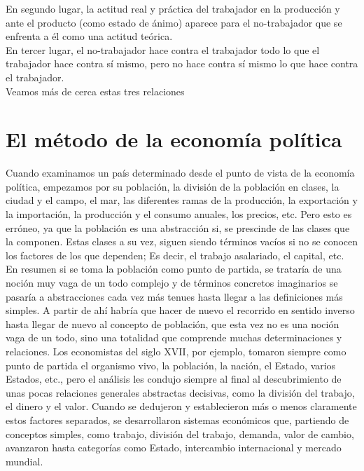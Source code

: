 En segundo lugar, la actitud real y práctica del trabajador en la producción y ante el producto (como estado de ánimo) aparece para el no-trabajador que se enfrenta a él como una actitud teórica. \\

En tercer lugar, el no-trabajador hace contra el trabajador todo lo que el trabajador hace contra sí mismo, pero no hace contra sí mismo lo que hace contra el trabajador.\\

Veamos más de cerca estas tres relaciones

\section{El método de la economía política}

Cuando examinamos un país determinado desde el punto de vista de la economía política, empezamos por su población, la división de la población en clases, la ciudad y el campo, el mar, las diferentes ramas de la producción, la exportación y la importación, la producción y el consumo anuales, los precios, etc. Pero esto es erróneo, ya que la población es una abstracción si, se prescinde de las clases que la componen. Estas clases a su vez, siguen siendo términos vacíos si no se conocen los factores de los que dependen; Es decir, el trabajo asalariado, el capital, etc. En resumen si se toma la población como punto de partida, se trataría de una noción muy vaga de un todo complejo y de términos concretos imaginarios se pasaría a abstracciones cada vez más tenues hasta llegar a las definiciones más simples. A partir de ahí habría que hacer de nuevo el recorrido en sentido inverso hasta llegar de nuevo al concepto de población, que esta vez no es una noción vaga de un todo, sino una totalidad que comprende muchas determinaciones y relaciones.  Los economistas del siglo XVII, por ejemplo, tomaron siempre como punto de partida el organismo vivo, la población, la nación, el Estado, varios Estados, etc., pero el análisis les condujo siempre al final al descubrimiento de unas pocas relaciones generales abstractas decisivas, como la división del trabajo, el dinero y el valor. Cuando se dedujeron y establecieron más o menos claramente estos factores separados, se desarrollaron sistemas económicos que, partiendo de conceptos simples, como trabajo, división del trabajo, demanda, valor de cambio, avanzaron hasta categorías como Estado, intercambio internacional y mercado mundial.\\

